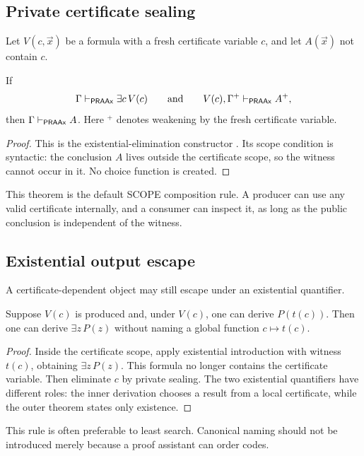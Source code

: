 \subsection{Private certificate sealing}

Let \(V(c,\vec x)\) be a formula with a fresh certificate variable \(c\), and let \(A(\vec x)\) not contain \(c\).

\begin{theorem}
If
\[
  \Gamma\vdash_{\mathsf{PRAAx}}\exists c\,V(c)
  \qquad\text{and}\qquad
  V(c),\Gamma^{+}\vdash_{\mathsf{PRAAx}}A^{+},
\]
then \(\Gamma\vdash_{\mathsf{PRAAx}}A\).  Here \({}^{+}\) denotes weakening by the fresh certificate variable.
\end{theorem}
\begin{proof}
This is the existential-elimination constructor .  Its scope condition is syntactic: the conclusion \(A\) lives outside the certificate scope, so the witness cannot occur in it.  No choice function is created.
\end{proof}

This theorem is the default SCOPE composition rule.  A producer can use any valid certificate internally, and a consumer can inspect it, as long as the public conclusion is independent of the witness.

\subsection{Existential output escape}

A certificate-dependent object may still escape under an existential quantifier.

\begin{theorem}
Suppose \(V(c)\) is produced and, under \(V(c)\), one can derive \(P(t(c))\).  Then one can derive \(\exists z\,P(z)\) without naming a global function \(c\mapsto t(c)\).
\end{theorem}
\begin{proof}
Inside the certificate scope, apply existential introduction with witness \(t(c)\), obtaining \(\exists z\,P(z)\).  This formula no longer contains the certificate variable.  Then eliminate \(c\) by private sealing.  The two existential quantifiers have different roles: the inner derivation chooses a result from a local certificate, while the outer theorem states only existence.
\end{proof}

This rule is often preferable to least search.  Canonical naming should not be introduced merely because a proof assistant can order codes.

